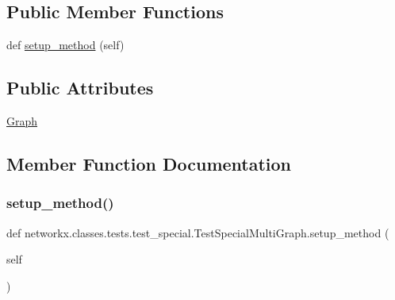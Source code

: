 \subsection*{Public Member Functions}
\begin{DoxyCompactItemize}
\item 
def \hyperlink{classnetworkx_1_1classes_1_1tests_1_1test__special_1_1TestSpecialMultiGraph_ab487478220b2a506a7a31e29a354478f}{setup\+\_\+method} (self)
\end{DoxyCompactItemize}
\subsection*{Public Attributes}
\begin{DoxyCompactItemize}
\item 
\hyperlink{classnetworkx_1_1classes_1_1tests_1_1test__special_1_1TestSpecialMultiGraph_aa7130e2f71acfecf14088dba6f7b83b7}{Graph}
\end{DoxyCompactItemize}


\subsection{Member Function Documentation}
\mbox{\label{classnetworkx_1_1classes_1_1tests_1_1test__special_1_1TestSpecialMultiGraph_ab487478220b2a506a7a31e29a354478f}} 
\subsubsection{\texorpdfstring{setup\+\_\+method()}{setup\_method()}}
{\footnotesize\ttfamily def networkx.\+classes.\+tests.\+test\+\_\+special.\+Test\+Special\+Multi\+Graph.\+setup\+\_\+method (\begin{DoxyParamCaption}\item[{}]{self }\end{DoxyParamCaption})}



